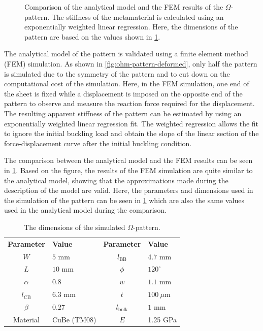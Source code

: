 \begin{figure}[htb] %
  \centering
  \resizebox{0.6\textwidth}{!}{}
  \caption[Comparison of the analytical model and the FEM results of the $\Omega$-pattern]{Comparison of the analytical model and the FEM results of the $\Omega$-pattern. The stiffness of the metamaterial is calculated using an exponentially weighted linear regression. Here, the dimensions of the pattern are based on the values shown in \cref{tab:pattern-dimensions}.}
  \label{fig:ohm-kiri-am-fem-comparison}
\end{figure}

The analytical model of the pattern is validated using a finite element method (FEM) simulation. As shown in \cref{fig:ohm-pattern-deformed}, only half the pattern is simulated due to the symmetry of the pattern and to cut down on the computational cost of the simulation. Here, in the FEM simulation, one end of the sheet is fixed while a displacement is imposed on the opposite end of the pattern to observe and measure the reaction force required for the displacement. The resulting apparent stiffness of the pattern can be estimated by using an exponentially weighted linear regression fit. The weighted regression allows the fit to ignore the initial buckling load and obtain the slope of the linear section of the force-displacement curve after the initial buckling condition.

The comparison between the analytical model and the FEM results can be seen in \cref{fig:ohm-kiri-am-fem-comparison}. Based on the figure, the results of the FEM simulation are quite similar to the analytical model, showing that the approximations made during the description of the model are valid. Here, the parameters and dimensions used in the simulation of the pattern can be seen in \cref{tab:pattern-dimensions} which are also the same values used in the analytical model during the comparison.

\begin{table}[hbt!]
\centering
\caption{The dimensions of the simulated $\Omega$-pattern.}
\label{tab:pattern-dimensions}
\renewcommand{\arraystretch}{1.2}
{
\begin{tabular}{clcl}
    \rowcolor{black} {\color{white}\textbf{Parameter}} & {\color{white}\textbf{Value}} & {\color{white}\textbf{Parameter}} & {\color{white}\textbf{Value}}\\
    $W$         & $5$ mm  & $l_\mathrm{BB}$       & $4.7$ mm \\
    $L$         & $10$ mm  & $\phi$       & $120^\circ$   \\
    $\alpha$     & $0.8$    & $w$         & $1.1$ mm \\
    $l_\mathrm{CB}$       & $6.3$ mm & $t$         & $100~\mu$m    \\
    $\beta$      & $0.27$   & $l_\mathrm{bulk}$    & $1$ mm \\
    Material & CuBe (TM08) & $E$ & 1.25 GPa
\end{tabular}}
\end{table}


